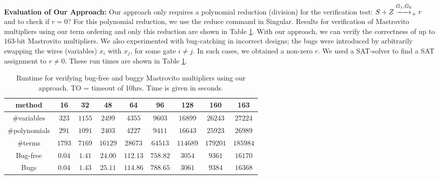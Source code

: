 {\bf Evaluation of Our Approach:} 
Our approach only requires a polynomial reduction (division) for the
verification test:
$S+Z\stackrel{G_1,G_0}{\textstyle\xrightarrow{\hspace*{15pt}}}_+ r$
and to check if $r=0$?  
For this polynomial reduction, we use the {\sc reduce} command in {\sc
  Singular}. Results for verification of Mastrovito multipliers using
our term ordering and only this reduction are shown in Table
\ref{tab:ourmas}. With our approach, we can verify the correctness of
up to $163$-bit Mastrovito multipliers. We also experimented with
bug-catching in incorrect designs; the bugs were introduced by
arbitrarily swapping the wires (variables) $x_i$ with $x_j$, for some
gate $i \neq j$. In such cases, we obtained a non-zero $r$. We used a
SAT-solver to find a SAT assignment to $r \neq 0$.
These run times are shown in Table \ref{tab:ourmas}.


\begin{table}[h!]
\begin{center}
\caption{ Runtime for verifying bug-free and buggy Mastrovito
  multipliers using our approach. TO = timeout of 10hrs. Time is given in seconds.} 
\label{tab:ourmas}
\begin{tabular}{|c||c|c|c|c|c|c|c|c|} \hline 
method & 16 & 32 & 48 & 64 & 96 & 128  &160 &163\\
\hline
\#variables &$323$ 	&$1155$ 	&$2499$ 	&$4355$ 	&$9603$ 	&$16899$ 	&$26243$ 	&$27224$ \\
\hline
\#polynomials &$291$ &$1091$ 	&$2403$ 	&$4227$ 	&$9411$ 	&$16643$ 	&$25923$ 	&$26989$ \\
\hline
\#terms &$1793$ &$7169$ 		&$16129$ 	&$28673$ 	&$64513$ 	&$114689$ 	&$179201$ 	&$185984$ \\
\hline
Bug-free &$0.04$ &$1.41$ 		&$24.00$ 	&$112.13$ 	&$758.82$ 	&$3054$ 	&$9361$ 	&$16170$ \\
\hline
Bugs & $0.04$ &$1.43$			&$25.11$ 	&$114.86$ 	&$788.65$ 	&$3061$  	&$9384$ 	&$16368$\\
\hline
\end{tabular}
\end{center}
\end{table}


